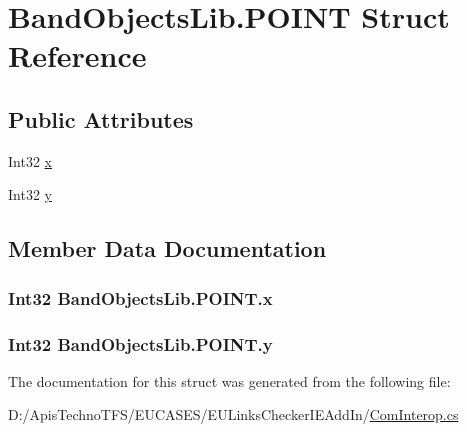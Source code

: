 \hypertarget{struct_band_objects_lib_1_1_p_o_i_n_t}{\section{Band\+Objects\+Lib.\+P\+O\+I\+N\+T Struct Reference}
\label{struct_band_objects_lib_1_1_p_o_i_n_t}
}
\subsection*{Public Attributes}
\begin{DoxyCompactItemize}
\item 
Int32 \hyperlink{struct_band_objects_lib_1_1_p_o_i_n_t_a6069af6694a795f8fb73879bacf6e065}{x}
\item 
Int32 \hyperlink{struct_band_objects_lib_1_1_p_o_i_n_t_a25e572aff725119b35700556e251a16f}{y}
\end{DoxyCompactItemize}


\subsection{Member Data Documentation}
\hypertarget{struct_band_objects_lib_1_1_p_o_i_n_t_a6069af6694a795f8fb73879bacf6e065}{
\subsubsection[{x}]{\setlength{\rightskip}{0pt plus 5cm}Int32 Band\+Objects\+Lib.\+P\+O\+I\+N\+T.\+x}}\label{struct_band_objects_lib_1_1_p_o_i_n_t_a6069af6694a795f8fb73879bacf6e065}
\hypertarget{struct_band_objects_lib_1_1_p_o_i_n_t_a25e572aff725119b35700556e251a16f}{
\subsubsection[{y}]{\setlength{\rightskip}{0pt plus 5cm}Int32 Band\+Objects\+Lib.\+P\+O\+I\+N\+T.\+y}}\label{struct_band_objects_lib_1_1_p_o_i_n_t_a25e572aff725119b35700556e251a16f}


The documentation for this struct was generated from the following file\+:\begin{DoxyCompactItemize}
\item 
D\+:/\+Apis\+Techno\+T\+F\+S/\+E\+U\+C\+A\+S\+E\+S/\+E\+U\+Links\+Checker\+I\+E\+Add\+In/\hyperlink{_com_interop_8cs}{Com\+Interop.\+cs}\end{DoxyCompactItemize}
